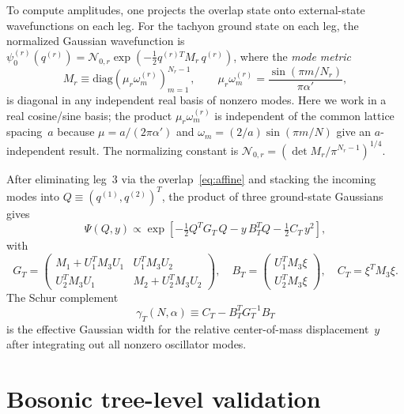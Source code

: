 \documentclass[11pt]{article}
\newcommand{\al}{\alpha'}
\begin{document}
To compute amplitudes, one projects the overlap state onto external-state wavefunctions on each leg. For the tachyon ground state on each leg, the normalized Gaussian wavefunction is $\psi_0^{(r)}(q^{(r)}) = \mathcal{N}_{0,r}\exp(-\frac{1}{2}q^{(r)T}M_r\,q^{(r)})$, where the \emph{mode metric}
\begin{equation}
M_r \equiv \mathrm{diag}\!\left(\mu_r\omega_m^{(r)}\right)_{m=1}^{N_r-1},
\qquad \mu_r\omega_m^{(r)} = \frac{\sin(\pi m/N_r)}{\pi\al},
\label{eq:mode-metric}
\end{equation}
is diagonal in any independent real basis of nonzero modes. Here we work in a real cosine/sine basis; the product $\mu_r\omega_m^{(r)}$ is independent of the common lattice spacing~$a$ because $\mu = a/(2\pi\al)$ and $\omega_m = (2/a)\sin(\pi m/N)$ give an $a$-independent result. The normalizing constant is $\mathcal{N}_{0,r} = (\det M_r/\pi^{N_r - 1})^{1/4}$.

After eliminating leg~3 via the overlap~\eqref{eq:affine} and stacking the incoming modes into $Q \equiv (q^{(1)}, q^{(2)})^T$, the product of three ground-state Gaussians gives
\begin{equation}
\Psi(Q, y) \propto \exp\!\left[-\tfrac{1}{2}Q^T G_T\,Q - y\,B_T^T Q - \tfrac{1}{2}C_T\,y^2\right],
\label{eq:gaussian}
\end{equation}
with
\begin{equation}
G_T = \begin{pmatrix}M_1 + U_1^T M_3 U_1 & U_1^T M_3 U_2 \\
U_2^T M_3 U_1 & M_2 + U_2^T M_3 U_2\end{pmatrix},
\quad
B_T = \begin{pmatrix}U_1^T M_3\xi \\ U_2^T M_3\xi\end{pmatrix},
\quad
C_T = \xi^T M_3\xi.
\label{eq:GT}
\end{equation}
The Schur complement
\begin{equation}
\gamma_T(N, \alpha) \equiv C_T - B_T^T G_T^{-1}B_T
\label{eq:gamma}
\end{equation}
is the effective Gaussian width for the relative center-of-mass displacement~$y$ after integrating out all nonzero oscillator modes.

\section{Bosonic tree-level validation}
\label{sec:bosonic}
\end{document}
